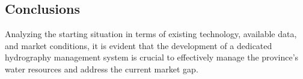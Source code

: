 \subsection{Conclusions} Analyzing the starting situation in terms of existing technology, available data, and market conditions, it is evident that the development of a dedicated hydrography management system is crucial to effectively manage the province's water resources and address the current market gap.